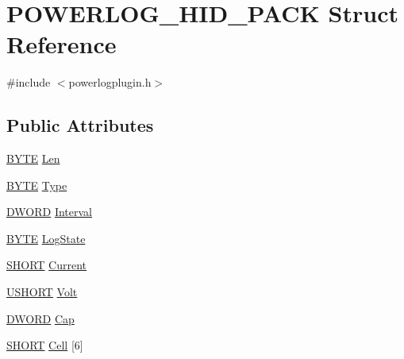 \hypertarget{struct_p_o_w_e_r_l_o_g___h_i_d___p_a_c_k}{\section{\-P\-O\-W\-E\-R\-L\-O\-G\-\_\-\-H\-I\-D\-\_\-\-P\-A\-C\-K \-Struct \-Reference}
\label{struct_p_o_w_e_r_l_o_g___h_i_d___p_a_c_k}
}


{\ttfamily \#include $<$powerlogplugin.\-h$>$}

\subsection*{\-Public \-Attributes}
\begin{DoxyCompactItemize}
\item 
\hyperlink{group__powerlogplugin_ga4ae1dab0fb4b072a66584546209e7d58}{\-B\-Y\-T\-E} \hyperlink{struct_p_o_w_e_r_l_o_g___h_i_d___p_a_c_k_afca596baeeb6eef4b094d3fb62505d76}{\-Len}
\item 
\hyperlink{group__powerlogplugin_ga4ae1dab0fb4b072a66584546209e7d58}{\-B\-Y\-T\-E} \hyperlink{struct_p_o_w_e_r_l_o_g___h_i_d___p_a_c_k_a36832eaffe0839ffe2d8e88787f6a798}{\-Type}
\item 
\hyperlink{group__powerlogplugin_gad342ac907eb044443153a22f964bf0af}{\-D\-W\-O\-R\-D} \hyperlink{struct_p_o_w_e_r_l_o_g___h_i_d___p_a_c_k_ac134fb81539e13bd1050cf7dfc76e600}{\-Interval}
\item 
\hyperlink{group__powerlogplugin_ga4ae1dab0fb4b072a66584546209e7d58}{\-B\-Y\-T\-E} \hyperlink{struct_p_o_w_e_r_l_o_g___h_i_d___p_a_c_k_a001f8177243106800aacb838bf8fb368}{\-Log\-State}
\item 
\hyperlink{group__powerlogplugin_ga9909bd3cf05f0906045f2ee85be4eeac}{\-S\-H\-O\-R\-T} \hyperlink{struct_p_o_w_e_r_l_o_g___h_i_d___p_a_c_k_af7ee71154ffb1eb06f52a5ddd6192dfc}{\-Current}
\item 
\hyperlink{group__powerlogplugin_ga5850d5316caf7f4cedd742fdf8cd7c02}{\-U\-S\-H\-O\-R\-T} \hyperlink{struct_p_o_w_e_r_l_o_g___h_i_d___p_a_c_k_ad9cd709bfba747e457f92eb02eb01146}{\-Volt}
\item 
\hyperlink{group__powerlogplugin_gad342ac907eb044443153a22f964bf0af}{\-D\-W\-O\-R\-D} \hyperlink{struct_p_o_w_e_r_l_o_g___h_i_d___p_a_c_k_a17471b70ab588a58cfdbf608a04a3d53}{\-Cap}
\item 
\hyperlink{group__powerlogplugin_ga9909bd3cf05f0906045f2ee85be4eeac}{\-S\-H\-O\-R\-T} \hyperlink{struct_p_o_w_e_r_l_o_g___h_i_d___p_a_c_k_a13d6b3eadb4447aa5353664cf897a504}{\-Cell} \mbox{[}6\mbox{]}

\end{DoxyCompactItemize}
